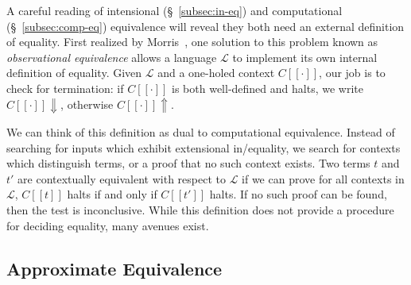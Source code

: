 \documentclass[11pt]{article}
\begin{document}
    A careful reading of intensional (\S~\ref{subsec:in-eq}) and computational (\S~\ref{subsec:comp-eq}) equivalence will reveal they both need an external definition of equality. First realized by Morris~\cite{morris1969lambda}, one solution to this problem known as \textit{observational equivalence} allows a language $\mathcal{L}$ to implement its own internal definition of equality. Given $\mathcal{L}$ and a one-holed context $C[\![\cdot]\!]$, our job is to check for termination: if $C[\![\cdot]\!]$ is both well-defined and halts, we write $C[\![\cdot]\!]\Downarrow$, otherwise $C[\![\cdot]\!]\Uparrow$.



    We can think of this definition as dual to computational equivalence. Instead of searching for inputs which exhibit extensional in/equality, we search for contexts which distinguish terms, or a proof that no such context exists. Two terms $t$ and $t'$ are contextually equivalent with respect to $\mathcal{L}$ if we can prove for all contexts in $\mathcal{L}$, $C[\![t]\!]$ halts if and only if $C[\![t']\!]$ halts. If no such proof can be found, then the test is inconclusive. While this definition does not provide a procedure for deciding equality, many avenues exist.



    \subsection{Approximate Equivalence}\label{sec:ap-eq}
\end{document}
